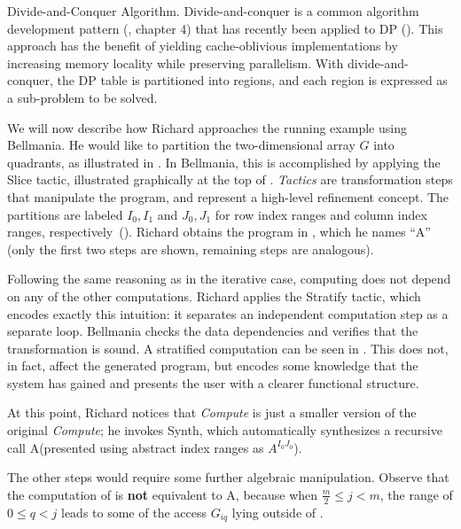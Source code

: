 \begin{paragraph}{Divide-and-Conquer Algorithm.}
Divide-and-conquer is a common algorithm development pattern (\cite{09/CLRS}, chapter 4) that has recently
been applied to DP (\cite{SODA06/Chowdhury,SPAA08/Chowdhury,TOCS10/Chowdhury,TCBB10/Chowdhury}).
This approach has the benefit of yielding cache-oblivious implementations by
increasing memory locality while preserving parallelism. With divide-and-conquer,
the DP table is partitioned into regions, and each region is expressed as a sub-problem
to be solved.

We will now describe how Richard approaches the running example using Bellmania.
He would like to partition the two-di\-men\-sio\-nal array $G$ into
quadrants, as illustrated in .
In Bellmania, this is accomplished by applying the {\sf Slice} tactic,
illustrated graphically at the top of .
{\em Tactics} are transformation steps that manipulate the program,
and represent a high-level refinement concept.
The partitions are labeled $I_0,I_1$ and $J_0,J_1$ for row index ranges and column index ranges,
respectively~().
Richard obtains the program in , which he names ``A'' 
(only the first two steps are shown, remaining steps are analogous).

Following the same reasoning as in the iterative case, computing 
does not depend on any of the other computations. Richard applies the
{\sf Stratify} tactic, which encodes exactly this intuition: it separates
an independent computation step as a separate loop.
Bellmania checks the data dependencies and verifies that the transformation
is sound.
A stratified computation can be seen in . This does not,
in fact, affect the generated program, but encodes some knowledge that the
system has gained and presents the user with a clearer functional structure.
\end{paragraph}

\medskip
At this point, Richard notices that {\it Compute } is just a smaller version of
the original {\it Compute}; he invokes {\sf Synth}, which automatically
synthesizes a recursive call A
(presented using abstract index ranges as $A^{I_0J_0}$).

The other steps would require some further algebraic manipulation.
Observe that the computation of  is {\bf not} equivalent to
A, 
because when $\frac{m}{2} \leq j < m$, the range of $0\leq q < j$ leads to
some of the access $G_{iq}$ lying outside of .


